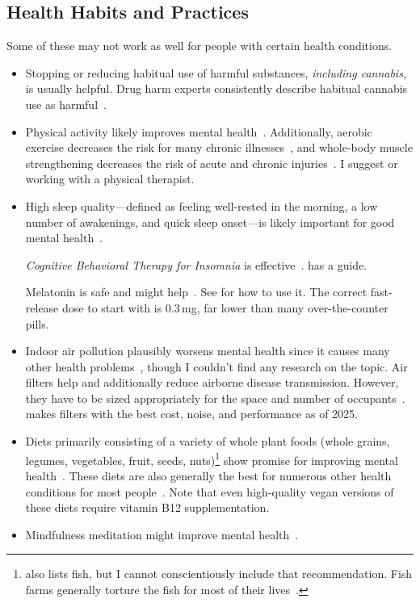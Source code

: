 \documentclass[11pt,oneside]{book}
\let\cite\parencite
\begin{document}
\subsection*{Health Habits and Practices}
Some of these may not work as well for people with certain health conditions.
\begin{itemize}
   \item Stopping or reducing habitual use of harmful substances, \textit{including cannabis,} is usually helpful. Drug harm experts consistently describe habitual cannabis use as harmful~\cite{nuttDrugHarms,bonomoHarms,crossinHarms}.
   \item Physical activity likely improves mental health~\cite{activityMetaAnalysis}. Additionally, aerobic exercise decreases the risk for many chronic illnesses~\cite{liebermanExercised}, and whole-body muscle strengthening decreases the risk of acute and chronic injuries~\cite{lauersenStrength}. I suggest \textcite{lowBodyweight} or working with a physical therapist.
   \item High sleep quality---defined as feeling well-rested in the morning, a low number of awakenings, and quick sleep onset---is likely important for good mental health~\cite{scottSleep}.
   
   \textit{Cognitive Behavioral Therapy for Insomnia} is effective~\cite{trauerCBTI}. \textcite{stanfordSleep} has a guide.
   
   Melatonin is safe and might help~\cite{moon2022role}. See \textcite{scottMelatonin} for how to use it. The correct fast-release dose to start with is 0.3\,mg, far lower than many over-the-counter pills.
   \item Indoor air pollution plausibly worsens mental health since it causes many other health problems~\cite{airPollution}, though I couldn't find any research on the topic. Air filters help and additionally reduce airborne disease transmission. However, they have to be sized appropriately for the space and number of occupants~\cite{filterSizing}. \textcite{cleanAir} makes filters with the best cost, noise, and performance as of 2025.
   \item Diets primarily consisting of a variety of whole plant foods (whole grains, legumes, vegetables, fruit, seeds, nuts)\footnote{\textcite{dietMentalHealth} also lists fish, but I cannot conscientiously include that recommendation. Fish farms generally torture the fish for most of their lives~\cite{singerLiberation}.} show promise for improving mental health~\cite{dietMentalHealth}. These diets are also generally the best for numerous other health conditions for most people~\cite{WillettEATLancet}. Note that even high-quality vegan versions of these diets require vitamin B12 supplementation.
   \item Mindfulness meditation might improve mental health~\cite{meditationMentalHealth}.
\end{itemize}
\end{document}
